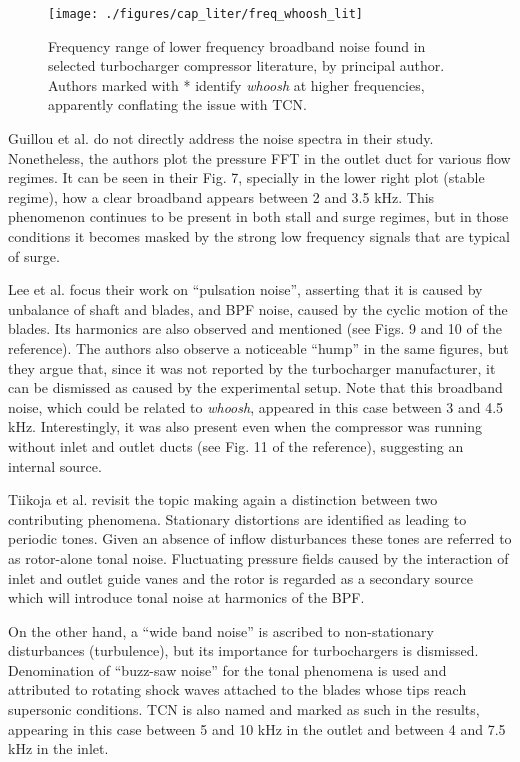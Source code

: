 \begin{wrapfigure}{o}[1.5cm]{0.4\textwidth}
\centering
\vspace{2mm}
\texttt{[image: ./figures/cap\_liter/freq\_whoosh\_lit]}
\caption[Range of some broadband noises found in the literature]{Frequency range of lower frequency broadband noise found in selected turbocharger compressor literature, by principal author. Authors marked with * identify \emph{whoosh} at higher frequencies, apparently conflating the issue with TCN.}
\label{fig:freq_whoosh_lit}
\end{wrapfigure}

Guillou et al. \cite{guillou2010characterization} do not directly address the noise spectra in their study. Nonetheless, the authors plot the pressure FFT in the outlet duct for various flow regimes. It can be seen in their Fig. 7, specially in the lower right plot (stable regime), how a clear broadband appears between 2 and 3.5 kHz. This phenomenon continues to be present in both stall and surge regimes, but in those conditions it becomes masked by the strong low frequency signals that are typical of surge.

Lee et al. \cite{lee2011control} focus their work on ``pulsation noise'', asserting that it is caused by unbalance of shaft and blades, and BPF noise, caused by the cyclic motion of the blades. Its harmonics are also observed and mentioned (see Figs. 9 and 10 of the reference). The authors also observe a noticeable ``hump'' in the same figures, but they argue that, since it was not reported by the turbocharger manufacturer, it can be dismissed as caused by the experimental setup. Note that this broadband noise, which could be related to \emph{whoosh}, appeared in this case between 3 and 4.5 kHz. Interestingly, it was also present even when the compressor was running without inlet and outlet ducts (see Fig. 11 of the reference), suggesting an internal source.

Tiikoja et al. \cite{tiikoja2011inves} revisit the topic making again a distinction between two contributing phenomena. Stationary distortions are identified as leading to periodic tones. Given an absence of inflow disturbances these tones are referred to as rotor-alone tonal noise. Fluctuating pressure fields caused by the interaction of inlet and outlet guide vanes and the rotor is regarded as a secondary source which will introduce tonal noise at harmonics of the BPF. 

On the other hand, a ``wide band noise'' is ascribed to non-stationary disturbances (turbulence), but its importance for turbochargers is dismissed. Denomination of ``buzz-saw noise'' for the tonal phenomena is used and attributed to rotating shock waves attached to the blades whose tips reach supersonic conditions. TCN is also named and marked as such in the results, appearing in this case between 5 and 10 kHz in the outlet and between 4 and 7.5 kHz in the inlet. 

